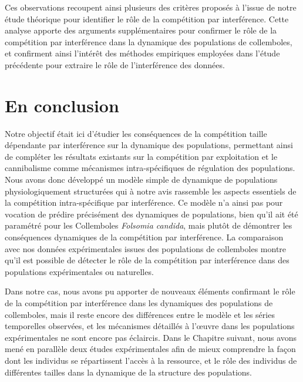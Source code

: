 Ces observations recoupent ainsi plusieurs des critères proposés à l'issue de
notre étude théorique pour identifier le rôle de la compétition par
interférence. Cette analyse apporte des arguments supplémentaires pour confirmer
le rôle de la compétition par interférence dans la dynamique des populations de
collemboles, et confirment ainsi l'intérêt des méthodes empiriques
employées dans l'étude précédente pour extraire le rôle de
l'interférence des données.

\section{En conclusion}

Notre objectif était ici d'étudier les conséquences de la compétition taille
dépendante par interférence sur la dynamique des populations, permettant ainsi
de compléter les résultats existants sur la compétition par exploitation et le
cannibalisme comme mécanismes intra-spécifiques de régulation des populations.
Nous avons donc développé un modèle simple de dynamique de populations physiologiquement
structurées qui à notre avis rassemble les aspects essentiels de la compétition
intra-spécifique par interférence. Ce modèle n'a ainsi pas pour vocation de
prédire précisément des dynamiques de populations, bien qu'il ait été paramétré
pour les Collemboles \textit{Folsomia candida}, mais plutôt de démontrer les
conséquences dynamiques de la compétition par interférence. La comparaison avec
nos données expérimentales issues des populations de collemboles montre qu'il
est possible de détecter le rôle de la compétition par interférence dans des
populations expérimentales ou naturelles. 

Dans notre cas, nous avons pu apporter de nouveaux éléments confirmant le rôle
de la compétition par interférence dans les dynamiques des populations de
collemboles, mais il reste encore des différences entre le modèle et les séries
temporelles observées, et les mécanismes détaillés à l'\oe{}uvre dans les
populations expérimentales ne sont encore pas éclaircis. Dans le Chapitre
suivant, nous avons mené en parallèle deux études expérimentales afin de mieux
comprendre la façon dont les individus se répartissent l'accès à la ressource,
et le rôle des individus de différentes tailles dans la dynamique de la structure
des populations.

